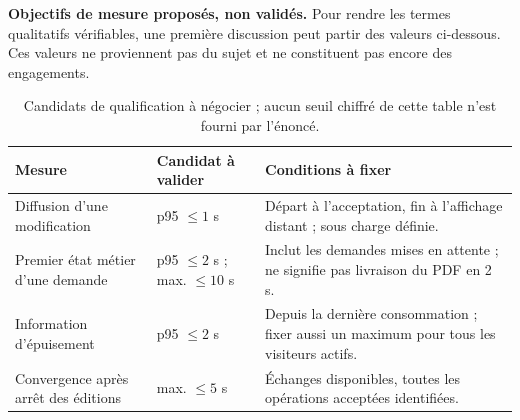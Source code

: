 
\textbf{Objectifs de mesure proposés, non validés.} Pour rendre les termes qualitatifs vérifiables, une première discussion peut partir des valeurs ci-dessous. Ces valeurs ne proviennent pas du sujet et ne constituent pas encore des engagements.
\begin{table}[H]\small
\begin{tabularx}{\linewidth}{@{}L{48mm}L{34mm}Y@{}}\toprule
Mesure & Candidat à valider & Conditions à fixer\\\midrule
Diffusion d'une modification & p95 $\leq 1$ s & Départ à l'acceptation, fin à l'affichage distant ; sous charge définie.\\
Premier état métier d'une demande & p95 $\leq 2$ s ; max. $\leq 10$ s & Inclut les demandes mises en attente ; ne signifie pas livraison du PDF en 2 s.\\
Information d'épuisement & p95 $\leq 2$ s & Depuis la dernière consommation ; fixer aussi un maximum pour tous les visiteurs actifs.\\
Convergence après arrêt des éditions & max. $\leq 5$ s & Échanges disponibles, toutes les opérations acceptées identifiées.\\\bottomrule
\end{tabularx}
\caption{Candidats de qualification à négocier ; aucun seuil chiffré de cette table n'est fourni par l'énoncé.}
\end{table}

